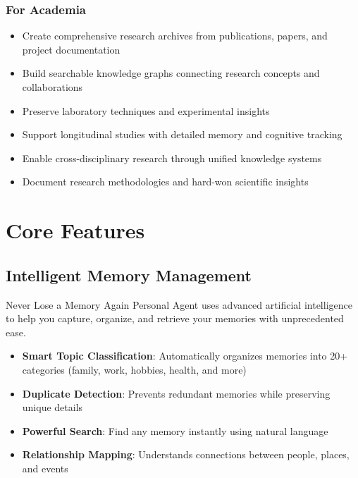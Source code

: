 \documentclass[11pt,letterpaper]{article}
\begin{document}
\subsubsection{For Academia}
\begin{itemize}[leftmargin=*]
    \item Create comprehensive research archives from publications, papers, and project documentation
    \item Build searchable knowledge graphs connecting research concepts and collaborations
    \item Preserve laboratory techniques and experimental insights
    \item Support longitudinal studies with detailed memory and cognitive tracking
    \item Enable cross-disciplinary research through unified knowledge systems
    \item Document research methodologies and hard-won scientific insights
\end{itemize}

\newpage
\section{Core Features}

\subsection{Intelligent Memory Management}

\begin{featurebox}{Never Lose a Memory Again}
Personal Agent uses advanced artificial intelligence to help you capture, organize, and retrieve your memories with unprecedented ease.
\end{featurebox}

\begin{itemize}[leftmargin=*]
    \item \textbf{Smart Topic Classification}: Automatically organizes memories into 20+ categories (family, work, hobbies, health, and more)
    \item \textbf{Duplicate Detection}: Prevents redundant memories while preserving unique details
    \item \textbf{Powerful Search}: Find any memory instantly using natural language
    \item \textbf{Relationship Mapping}: Understands connections between people, places, and events
\end{itemize}
\end{document}
